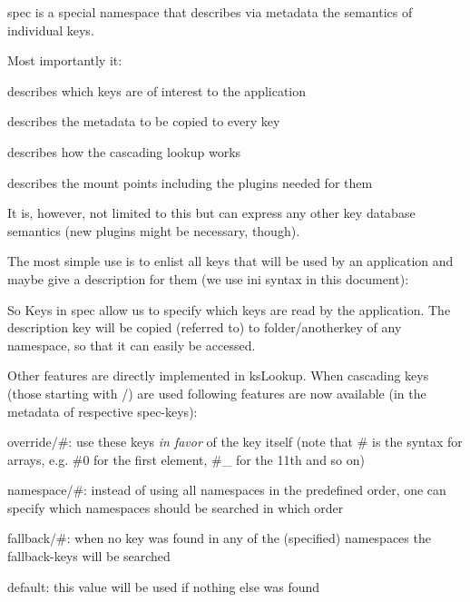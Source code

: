 spec is a special namespace that describes via metadata the semantics of individual keys.

Most importantly it\+:


\begin{DoxyEnumerate}
\item describes which keys are of interest to the application
\item describes the metadata to be copied to every key
\item describes how the cascading lookup works
\item describes the mount points including the plugins needed for them
\end{DoxyEnumerate}

It is, however, not limited to this but can express any other key database semantics (new plugins might be necessary, though).

The most simple use is to enlist all keys that will be used by an application and maybe give a description for them (we use ini syntax in this document)\+:


\begin{DoxyCode}{0}
\DoxyCodeLine{[mykey]}
\DoxyCodeLine{}
\end{DoxyCode}


So Keys in {\ttfamily spec} allow us to specify which keys are read by the application. The description key will be copied (referred to) to {\ttfamily folder/anotherkey} of any namespace, so that it can easily be accessed.

Other features are directly implemented in {\ttfamily ks\+Lookup}. When cascading keys (those starting with {\ttfamily /}) are used following features are now available (in the metadata of respective {\ttfamily spec}-\/keys)\+:


\begin{DoxyItemize}
\item {\ttfamily override/\#}\+: use these keys {\itshape in favor} of the key itself (note that {\ttfamily \#} is the syntax for arrays, e.\+g. {\ttfamily \#0} for the first element, {\ttfamily \#\+\_} for the 11th and so on)
\item {\ttfamily namespace/\#}\+: instead of using all namespaces in the predefined order, one can specify which namespaces should be searched in which order
\item {\ttfamily fallback/\#}\+: when no key was found in any of the (specified) namespaces the {\ttfamily fallback}-\/keys will be searched
\item {\ttfamily default}\+: this value will be used if nothing else was found
\end{DoxyItemize}

